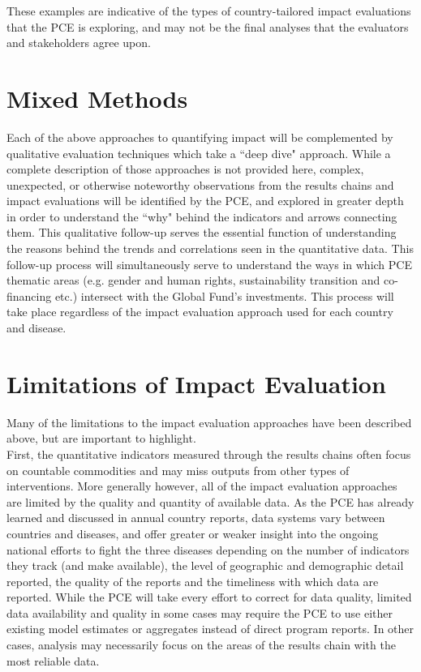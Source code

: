 \documentclass[twocolumn]{bmcart}%
\begin{document}
These examples are indicative of the types of country-tailored impact evaluations that the PCE is exploring, and may not be the final analyses that the evaluators and stakeholders agree upon. \\

\section{Mixed Methods}

Each of the above approaches to quantifying impact will be complemented by qualitative evaluation techniques which take a ``deep dive" approach. While a complete description of those approaches is not provided here, complex, unexpected, or otherwise noteworthy observations from the results chains and impact evaluations will be identified by the PCE, and explored in greater depth in order to understand the ``why" behind the indicators and arrows connecting them. This qualitative follow-up serves the essential function of understanding the reasons behind the trends and correlations seen in the quantitative data. This follow-up process will simultaneously serve to understand the ways in which PCE thematic areas (e.g. gender and human rights, sustainability transition and co-financing etc.) intersect with the Global Fund's investments. This process will take place regardless of the impact evaluation approach used for each country and disease. \\

\section{Limitations of Impact Evaluation}
Many of the limitations to the impact evaluation approaches have been described above, but are important to highlight. \\

First, the quantitative indicators measured through the results chains often focus on countable commodities and may miss outputs from other types of interventions. More generally however, all of the impact evaluation approaches are limited by the quality and quantity of available data. As the PCE has already learned and discussed in annual country reports, data systems vary between countries and diseases, and offer greater or weaker insight into the ongoing national efforts to fight the three diseases depending on the number of indicators they track (and make available), the level of geographic and demographic detail reported, the quality of the reports and the timeliness with which data are reported. While the PCE will take every effort to correct for data quality, limited data availability and quality in some cases may require the PCE to use either existing model estimates or aggregates instead of direct program reports. In other cases, analysis may necessarily focus on the areas of the results chain with the most reliable data. \\
\end{document}
